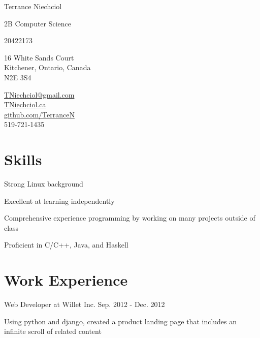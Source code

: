 \documentclass[10pt,letterpaper]{article}
\begin{document}
\begin{center}
{\Huge Terrance Niechciol}

2B Computer Science

20422173
\end{center}

\begin{minipage}[t]{0.5\textwidth}
\begin{center}
16 White Sands Court\\
Kitchener, Ontario, Canada\\
N2E 3S4\\
\end{center}
\end{minipage} %
\begin{minipage}[t]{0.5\textwidth}
\begin{center}
\href{mailto:TNiechciol@gmail.com}{TNiechciol@gmail.com}\\
\href{http://TNiechciol.ca}{TNiechciol.ca}\\
\href{https://github.com/TerranceN}{github.com/TerranceN}\\
519-721-1435\\
\end{center}
\end{minipage}

\section*{Skills}
    \begin{itemize*}
        \item Strong Linux background
        \item Excellent at learning independently
        \item Comprehensive experience programming by working on many projects outside of class
        \item Proficient in C/C++, Java, and Haskell
    \end{itemize*}

\section*{Work Experience}
    \begin{description}
        \item Web Developer at Willet Inc. \hfill Sep. 2012 - Dec. 2012
        \begin{description}
            \item Using python and django, created a product landing page that includes an infinite scroll of related content
        \end{description}
    \end{description}
\end{document}
